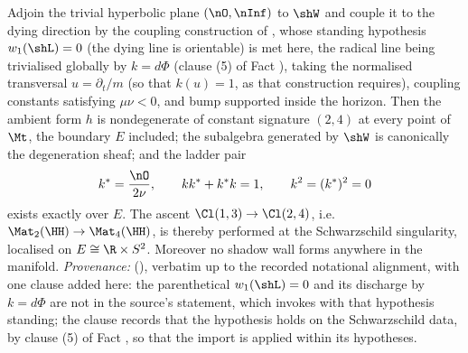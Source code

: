 Adjoin the trivial hyperbolic plane $(\nO, \nInf)$ to $\shW$ and couple it to the dying direction by the coupling construction of \cite[Def.~4.1]{ButlerT4}, whose standing hypothesis $w_1(\shL) = 0$ (the dying line is orientable) is met here, the radical line being trivialised globally by $k = d\Phi$ (clause (5) of Fact ), taking the normalised transversal $u = \partial_t/m$ (so that $k(u) = 1$, as that construction requires), coupling constants satisfying $\mu\nu < 0$, and bump supported inside the horizon. Then the ambient form $h$ is nondegenerate of constant signature $(2,4)$ at every point of $\Mt$, the boundary $E$ included; the subalgebra generated by $\shW$ is canonically the degeneration sheaf; and the ladder pair
\[
k^* = \frac{\nO}{2\nu}, \qquad k k^* + k^* k = 1, \qquad k^2 = (k^*)^2 = 0
\]
exists exactly over $E$. The ascent $\Cl(1,3) \to \Cl(2,4)$, i.e.\ $\Mat_2(\HH) \to \Mat_4(\HH)$, is thereby performed at the Schwarzschild singularity, localised on $E \cong \R \times S^2$. Moreover no shadow wall forms anywhere in the manifold.
\emph{Provenance:} \cite[Thm.~8.12]{ButlerT4} (), verbatim up to the recorded notational alignment, with one clause added here: the parenthetical $w_1(\shL) = 0$ and its discharge by $k = d\Phi$ are not in the source's statement, which invokes \cite[Def.~4.1]{ButlerT4} with that hypothesis standing; the clause records that the hypothesis holds on the Schwarzschild data, by clause (5) of Fact , so that the import is applied within its hypotheses.

